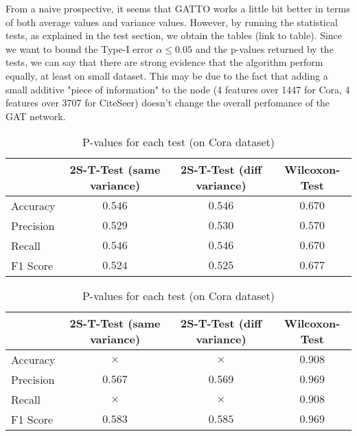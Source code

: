 \documentclass[12pt,conference]{ieeeconf} %
\begin{document}
From a naive prospective, it seems that GATTO works a little bit better in terms of both average values and variance values.
However, by running the statistical tests, as explained in the test section, we obtain the tables (link to table). Since we want to bound the Type-I error $\alpha \le 0.05$ and the p-values returned by the tests, we can say that there are strong evidence that the algorithm perform equally, at least on small dataset.
This may be due to the fact that adding a small additive "piece of information" to the node (4 features over 1447 for Cora, 4 features over 3707 for CiteSeer) doesn't change the overall perfomance of the GAT network.
\begin{table*}[h!]
    \centering 
    \begin{tabular}{|l|c|c|c|} 
    \hline
     & 2S-T-Test (same variance) & 2S-T-Test (diff variance) & Wilcoxon-Test\\ \hline
    Accuracy &$0.546$ &$0.546$ &$0.670$ \\ \hline
    Precision &$0.529$ &$0.530$ &$0.570$\\ \hline
    Recall &$0.546$ &$0.546$ &$0.670$\\ \hline
    F1 Score &$0.524$ &$0.525$ &$0.677$\\ \hline
    \end{tabular}
    \caption{P-values for each test (on Cora dataset)}
\end{table*}

\begin{table*}[h!]
    \centering 
    \begin{tabular}{|l|c|c|c|} 
    \hline
     & 2S-T-Test (same variance) & 2S-T-Test (diff variance) & Wilcoxon-Test\\ \hline
    Accuracy &$\times$ &$\times$ &$0.908$ \\ \hline
    Precision &$0.567$ &$0.569$ &$0.969$\\ \hline
    Recall &$\times$ &$\times$ &$0.908$\\ \hline
    F1 Score &$0.583$ &$0.585$ &$0.969$\\ \hline
    \end{tabular}
    \caption{P-values for each test (on Cora dataset)}
\end{table*}


\vspace{\fill}
\printbibliography
\newpage
\end{document}

